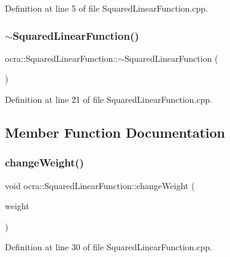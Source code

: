 Definition at line 5 of file Squared\+Linear\+Function.\+cpp.

\hypertarget{classocra_1_1SquaredLinearFunction_adc5c823cc6559151ef1081e8ff62624a}{}\label{classocra_1_1SquaredLinearFunction_adc5c823cc6559151ef1081e8ff62624a} 
\subsubsection{\texorpdfstring{$\sim$\+Squared\+Linear\+Function()}{~SquaredLinearFunction()}}
{\footnotesize\ttfamily ocra\+::\+Squared\+Linear\+Function\+::$\sim$\+Squared\+Linear\+Function (\begin{DoxyParamCaption}{ }\end{DoxyParamCaption})}



Definition at line 21 of file Squared\+Linear\+Function.\+cpp.



\subsection{Member Function Documentation}
\hypertarget{classocra_1_1SquaredLinearFunction_a4c8e5adac8c2d7af02880d4ac5011f83}{}\label{classocra_1_1SquaredLinearFunction_a4c8e5adac8c2d7af02880d4ac5011f83} 
\subsubsection{\texorpdfstring{change\+Weight()}{changeWeight()}}
{\footnotesize\ttfamily void ocra\+::\+Squared\+Linear\+Function\+::change\+Weight (\begin{DoxyParamCaption}\item[{const Vector\+Xd \&}]{weight }\end{DoxyParamCaption})}



Definition at line 30 of file Squared\+Linear\+Function.\+cpp.

\hypertarget{classocra_1_1SquaredLinearFunction_a95faea59867ec734fbdb46d936067d77}{}\label{classocra_1_1SquaredLinearFunction_a95faea59867ec734fbdb46d936067d77} 
